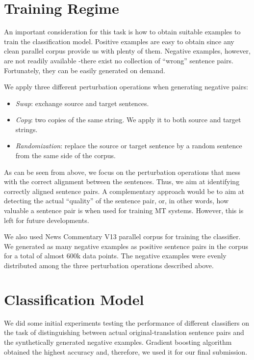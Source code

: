 \documentclass[a0]{sciposter}
\begin{document}
\begin{multicols*}{2}
\section*{\Large Training Regime}
An important consideration for this task is how to obtain suitable examples to train the classification model. Positive examples are easy to obtain since any clean parallel corpus provide us with plenty of them. Negative examples, however, are not readily available -there exist no collection of ``wrong'' sentence pairs. Fortunately, they can be easily generated on demand. 

We apply three different perturbation operations when generating negative pairs:
\begin{itemize}
  \item \textit{Swap}: exchange source and target sentences.
  \item \textit{Copy}: two copies of the same string. We apply it to both source and target strings.
  \item \textit{Randomization}: replace the source or target sentence by a random sentence from the same side of the corpus.
\end{itemize}

As can be seen from above, we focus on the perturbation operations that mess with the correct alignment between the sentences. Thus, we aim at identifying correctly aligned sentence pairs. A complementary approach would be to aim at detecting the actual ``quality'' of the sentence pair, or, in other words, how valuable a sentence pair is when used for training MT systems. However, this is left for future developments.

We also used News Commentary V13 parallel corpus for training the classifier. We generated as many negative examples as positive sentence pairs in the corpus for a total of almost $600$k data points. The negative examples were evenly distributed among the three perturbation operations described above.


\section*{\Large Classification Model}
We did some initial experiments testing the performance of different classifiers on the task of distinguishing between actual original-translation sentence pairs and the synthetically generated negative examples. Gradient boosting algorithm obtained the highest accuracy and, therefore, we used it for our final submission.


\end{multicols*}
\end{document}
